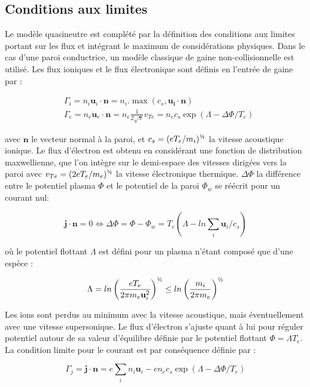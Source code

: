 \begin{refsection}
\subsection{Conditions aux limites}
Le modèle quasineutre est complété par la
définition des conditions aux limites portant sur les flux et intégrant le
maximum de considérations physiques. Dans le cas d'une paroi conductrice, un
modèle classique de gaine non-collisionnelle est utilisé. Les flux ioniques et
le flux électronique sont définis en l'entrée de gaine par :

\begin{align}
&\Gamma_i=n_i\mathbf{u}_i\cdot\mathbf{n}=n_i.\max\left(c_s,\mathbf{u_i}\cdot\mathbf{n}\right)
\\
&\Gamma_e=n_e\mathbf{u}_e\cdot\mathbf{n}=n_e\frac{1}{2\sqrt{\pi}}v_{Te}=n_ec_s\exp(\Lambda-\Delta
\Phi/T_e)
\end{align}

avec $\mathbf{n}$ le vecteur normal à la paroi,
et $c_s=(eT_e/m_i)^{\text{\textonehalf}}$ la vitesse acoustique ionique. Le flux
d'électron est obtenu en considérant une fonction de distribution maxwellienne, 
que l'on intègre sur le demi-espace des vitesses dirigées vers la paroi avec 
$v_{Te}=(2eT_e/m_e)^{\text{\textonehalf}}$ la vitesse électronique thermique.
$\Delta\Phi$ la différence entre le potentiel plasma $\Phi$ et le potentiel de
la paroi $\Phi_w$ se réécrit pour un courant nul:

\begin{equation}
	\mathbf{j}\cdot\mathbf{n}=0\Leftrightarrow \Delta \Phi=\Phi-\Phi_w =
T_e(\Lambda-ln\sum_i\mathbf u_i/c_s)
\end{equation} 

où le potentiel flottant $\Lambda$ est défini pour un plasma
n'étant composé que d'une espèce :

\begin{equation}
	\Lambda=ln\left(\frac{eT_e}{2\pi
	m_e\mathbf{u}_i^2}\right)^{\text{\textonehalf}} \le 
	ln\left(\frac{m_i}{2\pi m_e}\right)^{\text{\textonehalf}}
\end{equation}

Les ions sont perdus au minimum avec la vitesse acoustique, mais
éventuellement avec une vitesse supersonique. Le flux d'électron s'ajuste
quant à lui pour réguler potentiel autour de sa valeur
d'équilibre définie par le potentiel flottant $\Phi=\Lambda T_e$. La condition
limite pour le courant est par conséquence définie par :

\begin{equation}
\Gamma_j=\mathbf{j}\cdot\mathbf{n}=e\sum_in_i{\mathbf
u}_i-en_ec_s\exp(\Lambda-\Delta \Phi/T_e)
\end{equation}


\end{refsection}
